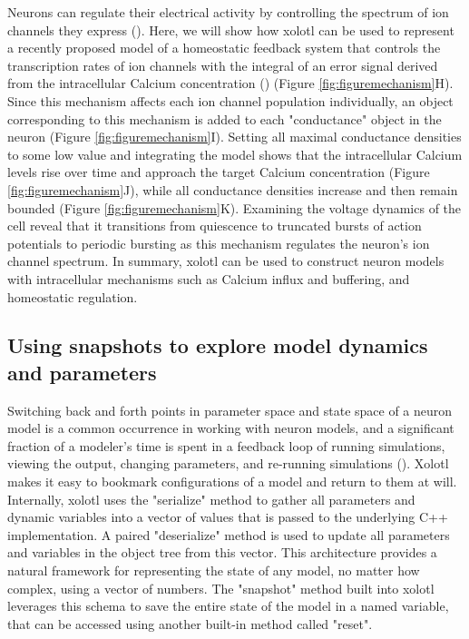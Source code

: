 \documentclass{frontiersSCNS} %
\begin{document}
Neurons can regulate their electrical activity by controlling the spectrum of ion channels they express (\cite{macleanActivityIndependentHomeostasisRhythmically2003, turrigianoSelectiveRegulationCurrent1995, schulzVariableChannelExpression2006}). Here, we will show how xolotl can be used to represent a recently proposed model of a homeostatic feedback system that controls the transcription rates of ion channels with the integral of an error signal derived from the intracellular Calcium concentration (\cite{olearyCorrelationsIonChannel2013, olearyCellTypesNetwork2014}) (Figure \ref{fig:figuremechanism}H). Since this mechanism affects each ion channel population individually, an object corresponding to this mechanism is added to each "conductance" object in the neuron (Figure \ref{fig:figuremechanism}I). Setting all maximal conductance densities to some low value and integrating the model shows that the intracellular Calcium levels rise over time and approach the target Calcium concentration (Figure \ref{fig:figuremechanism}J), while all conductance densities increase and then remain bounded (Figure \ref{fig:figuremechanism}K). Examining the voltage dynamics of the cell reveal that it transitions from quiescence to truncated bursts of action potentials to periodic bursting as this mechanism regulates the neuron's ion channel spectrum. In summary, xolotl can be used to construct neuron models with intracellular mechanisms such as Calcium influx and buffering, and homeostatic regulation.  




%
%
%
%
%




\subsection{Using snapshots to explore model dynamics and parameters}

Switching back and forth points in parameter space and state space of a neuron model is a common occurrence in working with neuron models, and a significant fraction of a modeler's time is spent in a feedback loop of running simulations, viewing the output, changing parameters, and re-running simulations (\cite{deschutterConsumerGuideNeuronal1992}). Xolotl makes it easy to bookmark configurations of a model and return to them at will. Internally, xolotl uses the "serialize" method to gather all parameters and dynamic variables into a vector of values that is passed to the underlying C++ implementation. A paired "deserialize" method is used to update all parameters and variables in the object tree from this vector. This architecture provides a natural framework for representing the state of any model, no matter how complex, using a vector of numbers. The "snapshot" method built into xolotl leverages this schema to save the entire state of the model in a named variable, that can be accessed using another built-in method called "reset".
\end{document}
